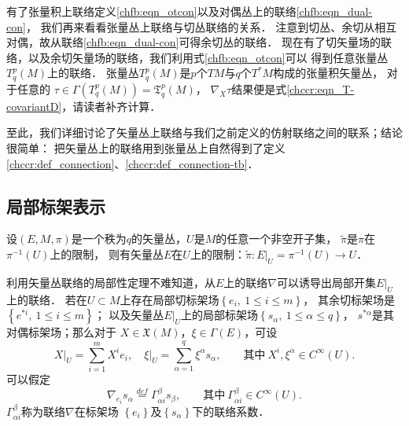 有了张量积上联络定义\eqref{chfb:eqn_otcon}以及对偶丛上的联络\eqref{chfb:eqn_dual-con}，
我们再来看看张量丛上联络与切丛联络的关系．
注意到切丛、余切从相互对偶，故从联络\eqref{chfb:eqn_dual-con}可得余切丛的联络．
现在有了切矢量场的联络，以及余切矢量场的联络，我们利用式\eqref{chfb:eqn_otcon}可以
得到任意张量丛 $T_q^p(M)$上的联络．
张量丛$T_q^p(M)$是$p$个$TM$与$q$个$T^* M$构成的张量积矢量丛，
对于任意的 $\tau \in \Gamma (T_q^p(M)) =\mathfrak{T}_q^p(M)$，
$\nabla_X \tau$结果便是式\eqref{chccr:eqn_T-covariantD}，请读者补齐计算．


至此，我们详细讨论了矢量丛上联络与我们之前定义的仿射联络之间的联系；结论很简单：
把矢量丛上的联络用到张量丛上自然得到了定义\ref{chccr:def_connection}、\ref{chccr:def_connection-tb}．


\subsection{局部标架表示}\label{chfb:sec_vc}

设$(E,M,\pi)$是一个秩为$q$的矢量丛，$U$是$M$的任意一个非空开子集，
$\tilde{\pi}$是$\pi$在 $\pi^{-1}(U)$上的限制，
则有矢量丛$E$在$U$上的限制：$\tilde{\pi}:\left.E\right|_U=\pi^{-1}(U) \to U$．

利用矢量丛联络的局部性定理不难知道，从$E$上的联络$\nabla$可以诱导出局部开集$\left.E\right|_U$上的联络．
若在$U\subset M$上存在局部切标架场$\left\{e_i,\ 1 \leqslant i \leqslant m\right\}$，
其余切标架场是$\left\{e^{*i},\ 1 \leqslant i \leqslant m\right\}$；
以及矢量丛$\left.E\right|_U$上的局部标架场$\left\{s_\alpha,\ 1 \leqslant \alpha \leqslant q\right\}$，
$s^{*\alpha}$是其对偶标架场；那么对于 $X \in \mathfrak{X}(M)$，$ \xi \in \Gamma(E)$，可设
\begin{equation*}
    \left.X\right|_U= \sum_{i=1}^{m}X^i e_i,\left.\quad 
    \xi\right|_U= \sum_{\alpha=1}^{q}\xi^\alpha s_\alpha,
    \qquad \text{其中} \  X^i, \xi^\alpha \in C^{\infty}(U) .
\end{equation*}
可以假定
\begin{equation}\label{chfb:eqn_con-Gamma}
    \nabla_{e_i} s_\alpha \overset{def}{=} \Gamma_{\alpha i}^\beta s_\beta,
    \qquad \text{其中}\  \Gamma_{\alpha i}^\beta \in C^{\infty}(U). 
\end{equation}
$\Gamma_{\alpha i}^\beta$称为联络$\nabla$在标架场
$\left\{e_i\right\}$及$\left\{s_\alpha\right\}$下的{\heiti 联络系数}． 

